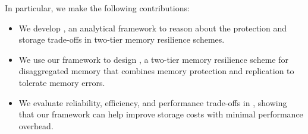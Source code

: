 In particular, we make the following contributions:

\begin{itemize}[leftmargin=*,noitemsep,topsep=0pt]

\item We develop \ramp, an analytical framework to reason about the protection and storage trade-offs in two-tier memory resilience schemes. 

\item We use our framework to design \rampdm, a two-tier memory resilience scheme for disaggregated memory that combines memory protection and replication to tolerate memory errors.

\item We evaluate reliability, efficiency, and performance trade-offs in \rampdm, showing that our framework can help improve storage costs with minimal performance overhead.

\end{itemize}